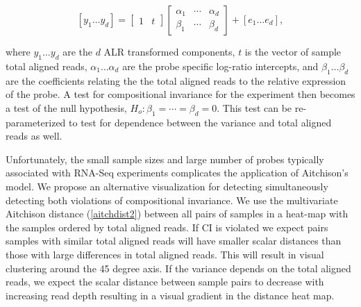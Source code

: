 \documentclass [10pt]{article}
\theoremstyle{definition}
\begin{document}
\begin{equation}
\left[y_1 \ldots y_d \right] = 
\left[
\begin{array}{cc}
1 & t
\end{array}
\right]
\left[
\begin{array}{ccc}
\alpha_1 & \cdots & \alpha_d\\
\beta_1 & \cdots & \beta_d
\end{array}
\right] 
+
\left[e_1 \ldots e_d \right],
\label{matrixModel}
\end{equation}

where $y_1 \ldots y_d$ are the $d$ ALR transformed components, $t$ is the vector of sample total aligned reads, $\alpha_1 \ldots \alpha_d$ are the probe specific log-ratio intercepts, and $\beta_1 \ldots \beta_d$ are the coefficients relating the the total aligned reads to the relative expression of the probe.  A test for compositional invariance for the experiment then becomes a test of the null hypothesis, $H_o: \beta_1 = \cdots = \beta_d = 0$. This test can be re-parameterized to test for dependence between the variance and total aligned reads as well.


Unfortunately, the small sample sizes and large number of probes typically associated with RNA-Seq experiments complicates the application of Aitchison's model.  
We propose an alternative visualization for detecting simultaneously detecting both violations of compositional invariance. We use the multivariate Aitchison distance (\ref{aitchdist2}) between all pairs of samples in a heat-map with the samples ordered by total aligned reads.  If CI is violated we expect pairs samples with similar total aligned reads will have smaller scalar distances than those with large differences in total aligned reads.  This will result in visual clustering around the 45 degree axis. If the variance depends on the total aligned reads, we expect the scalar distance between sample pairs to decrease with increasing read depth resulting in a visual gradient in the distance heat map.\\
\end{document}
